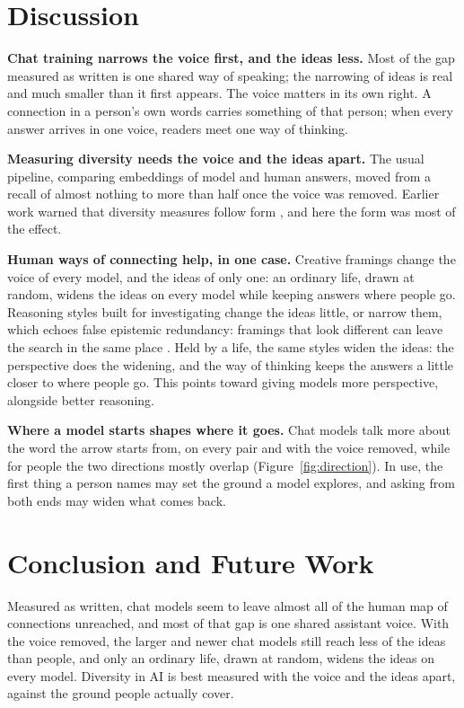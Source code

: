 \documentclass[11pt]{article}
\begin{document}
\section{Discussion}
\label{sec:discussion}

\textbf{Chat training narrows the voice first, and the ideas less.} Most of the gap measured as written is one shared way of speaking; the narrowing of ideas is real and much smaller than it first appears. The voice matters in its own right. A connection in a person's own words carries something of that person; when every answer arrives in one voice, readers meet one way of thinking.

\textbf{Measuring diversity needs the voice and the ideas apart.} The usual pipeline, comparing embeddings of model and human answers, moved from a recall of almost nothing to more than half once the voice was removed. Earlier work warned that diversity measures follow form \citep{tevet2021}, and here the form was most of the effect.

\textbf{Human ways of connecting help, in one case.} Creative framings change the voice of every model, and the ideas of only one: an ordinary life, drawn at random, widens the ideas on every model while keeping answers where people go. Reasoning styles built for investigating change the ideas little, or narrow them, which echoes false epistemic redundancy: framings that look different can leave the search in the same place \citep{gallego2026fer}. Held by a life, the same styles widen the ideas: the perspective does the widening, and the way of thinking keeps the answers a little closer to where people go. This points toward giving models more perspective, alongside better reasoning.

\textbf{Where a model starts shapes where it goes.} Chat models talk more about the word the arrow starts from, on every pair and with the voice removed, while for people the two directions mostly overlap (Figure~\ref{fig:direction}). In use, the first thing a person names may set the ground a model explores, and asking from both ends may widen what comes back.


\section{Conclusion and Future Work}
\label{sec:future}

Measured as written, chat models seem to leave almost all of the human map of connections unreached, and most of that gap is one shared assistant voice. With the voice removed, the larger and newer chat models still reach less of the ideas than people, and only an ordinary life, drawn at random, widens the ideas on every model. Diversity in AI is best measured with the voice and the ideas apart, against the ground people actually cover.
\end{document}
